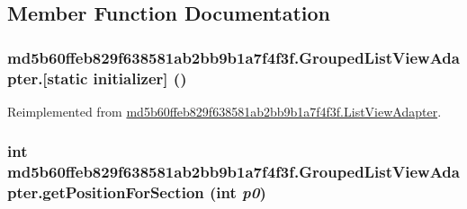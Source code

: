 \subsection{Member Function Documentation}
\hypertarget{classmd5b60ffeb829f638581ab2bb9b1a7f4f3f_1_1_grouped_list_view_adapter_fe703df4896b7de21a64f688845fb595}{
\subsubsection[{[static initializer]}]{\setlength{\rightskip}{0pt plus 5cm}md5b60ffeb829f638581ab2bb9b1a7f4f3f.GroupedListViewAdapter.\mbox{[}static initializer\mbox{]} ()}}
\label{classmd5b60ffeb829f638581ab2bb9b1a7f4f3f_1_1_grouped_list_view_adapter_fe703df4896b7de21a64f688845fb595}




Reimplemented from \hyperlink{classmd5b60ffeb829f638581ab2bb9b1a7f4f3f_1_1_list_view_adapter_95ad609e7ba116f4309bf26405bbcd43}{md5b60ffeb829f638581ab2bb9b1a7f4f3f.ListViewAdapter}.\hypertarget{classmd5b60ffeb829f638581ab2bb9b1a7f4f3f_1_1_grouped_list_view_adapter_f2a7abf78786d757e59276b12b020f80}{
\subsubsection[{getPositionForSection}]{\setlength{\rightskip}{0pt plus 5cm}int md5b60ffeb829f638581ab2bb9b1a7f4f3f.GroupedListViewAdapter.getPositionForSection (int {\em p0})}}
\label{classmd5b60ffeb829f638581ab2bb9b1a7f4f3f_1_1_grouped_list_view_adapter_f2a7abf78786d757e59276b12b020f80}


